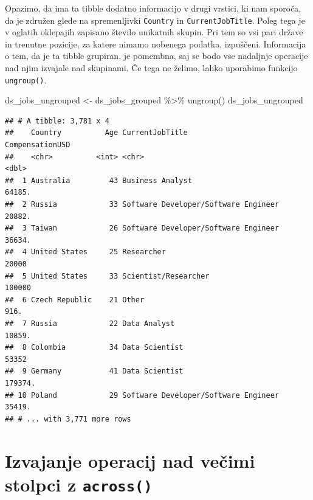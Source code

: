 \documentclass[
]{book}
\newenvironment{Shaded}{\begin{snugshade}}{\end{snugshade}}
\newcommand{\FunctionTok}[1]{\textcolor[rgb]{0.00,0.00,0.00}{#1}}
\newcommand{\NormalTok}[1]{#1}
\newcommand{\OtherTok}[1]{\textcolor[rgb]{0.56,0.35,0.01}{#1}}
\newcommand{\SpecialCharTok}[1]{\textcolor[rgb]{0.00,0.00,0.00}{#1}}
\begin{document}
Opazimo, da ima ta tibble dodatno informacijo v drugi vrstici, ki nam sporoča, da je združen glede na spremenljivki \texttt{Country} in \texttt{CurrentJobTitle}. Poleg tega je v oglatih oklepajih zapisano število unikatnih skupin. Pri tem so vsi pari države in trenutne pozicije, za katere nimamo nobenega podatka, izpuščeni. Informacija o tem, da je ta tibble grupiran, je pomembna, saj se bodo vse nadaljnje operacije nad njim izvajale nad skupinami. Če tega ne želimo, lahko uporabimo funkcijo \texttt{ungroup()}.

\begin{Shaded}
\begin{Highlighting}[]
\NormalTok{ds\_jobs\_ungrouped }\OtherTok{\textless{}{-}}\NormalTok{ ds\_jobs\_grouped }\SpecialCharTok{\%\textgreater{}\%}
  \FunctionTok{ungroup}\NormalTok{()}
\NormalTok{ds\_jobs\_ungrouped}
\end{Highlighting}
\end{Shaded}

\begin{verbatim}
## # A tibble: 3,781 x 4
##    Country          Age CurrentJobTitle                      CompensationUSD
##    <chr>          <int> <chr>                                          <dbl>
##  1 Australia         43 Business Analyst                              64185.
##  2 Russia            33 Software Developer/Software Engineer          20882.
##  3 Taiwan            26 Software Developer/Software Engineer          36634.
##  4 United States     25 Researcher                                    20000 
##  5 United States     33 Scientist/Researcher                         100000 
##  6 Czech Republic    21 Other                                           916.
##  7 Russia            22 Data Analyst                                  10859.
##  8 Colombia          34 Data Scientist                                53352 
##  9 Germany           41 Data Scientist                               179374.
## 10 Poland            29 Software Developer/Software Engineer          35419.
## # ... with 3,771 more rows
\end{verbatim}

\hypertarget{izvajanje-operacij-nad-veux10dimi-stolpci-z-across}{%
\section{\texorpdfstring{Izvajanje operacij nad večimi stolpci z \texttt{across()}}{Izvajanje operacij nad večimi stolpci z across()}}\label{izvajanje-operacij-nad-veux10dimi-stolpci-z-across}}
\end{document}
